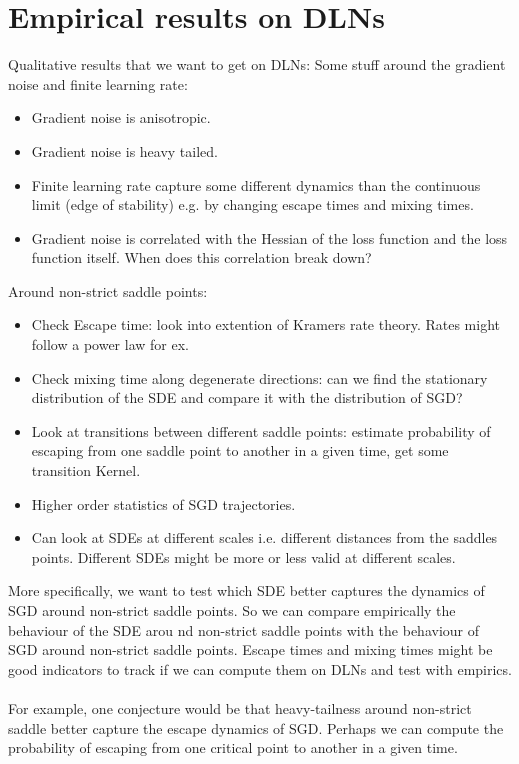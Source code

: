 \documentclass[11pt]{article}
\begin{document}
\section{Empirical results on DLNs}
Qualitative results that we want to get on DLNs:
Some stuff around the gradient noise and finite learning rate:
\begin{itemize}
    \item Gradient noise is anisotropic.
    \item Gradient noise is heavy tailed.
    \item Finite learning rate capture some different dynamics than the continuous limit (edge of stability) e.g. by changing escape times and mixing times.
    \item Gradient noise is correlated with the Hessian of the loss function and the loss function itself. When does this correlation break down?
\end{itemize}
Around non-strict saddle points:
\begin{itemize}
    \item Check Escape time: look into extention of Kramers rate theory. Rates might follow a power law for ex.
    \item Check mixing time along degenerate directions: can we find the stationary distribution of the SDE and compare it with the distribution of SGD?
    \item Look at transitions between different saddle points: estimate probability of escaping from one saddle point to another in a given time, get some transition Kernel.
    \item Higher order statistics of SGD trajectories.
    \item Can look at SDEs at different scales i.e. different distances from the saddles points. Different SDEs might be more or less valid at different scales.
\end{itemize}
More specifically, we want to test which SDE better captures the dynamics of SGD around non-strict saddle points. So we can compare empirically the behaviour of the SDE arou   nd non-strict saddle points with the behaviour of SGD around non-strict saddle points. Escape times and mixing times might be good indicators to track if we can compute them on DLNs and test with empirics.
\\
\\
For example, one conjecture would be that heavy-tailness around non-strict saddle better capture the escape dynamics of SGD. Perhaps we can compute the probability of escaping from one critical point to another in a given time.
\end{document}
